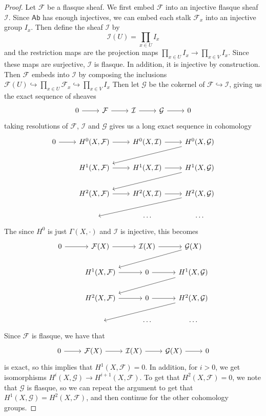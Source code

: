 \documentclass[psamsfonts, 12pt]{amsart}
\theoremstyle{definition}
\theoremstyle{remark}
\begin{document}
\begin{proof}
Let $\mathcal{F}$ be a flasque sheaf. We first embed $\mathcal{F}$ into an injective
flasque sheaf $\mathcal{I}$. Since $\mathsf{Ab}$ has enough injectives, we can embed
each stalk $\mathcal{F}_x$ into an injective group $I_x$. Then define the sheaf
$\mathcal{I}$ by
\[
\mathcal{I}(U) = \prod_{x \in U} I_x
\]
and the restriction maps are the projection maps
$\prod_{x \in U} I_x \to \prod_{x \in V} I_x$. Since these maps are surjective,
$\mathcal{I}$ is flasque. In addition, it is injective by construction. Then
$\mathcal{F}$ embeds into $\mathcal{I}$ by composing the inclusions
$\mathcal{F}(U)\hookrightarrow\prod_{x\in U}\mathcal{F}_x\hookrightarrow\prod_{x\in V}I_x$
Then let $\mathcal{G}$ be the cokernel of $\mathcal{F} \hookrightarrow \mathcal{I}$,
giving us the exact sequence of sheaves
\[\begin{tikzcd}
0 \ar[r] & \mathcal{F} \ar[r] & \mathcal{I} \ar[r] & \mathcal{G} \ar[r] & 0
\end{tikzcd}\]
taking resolutions of $\mathcal{F}$, $\mathcal{I}$ and $\mathcal{G}$ gives
us a long exact sequence in cohomology
\[\begin{tikzcd}
0 \ar[r] & H^0(X,\mathcal{F}) \ar[r] & H^0(X,\mathcal{I}) \ar[r]
& H^0(X,\mathcal{G}) \ar[dll] \\
& H^1(X,\mathcal{F}) \ar[r] & H^1(X, \mathcal{I}) \ar[r] & H^1(X,\mathcal{G})\ar[dll] \\
& H^2(X,\mathcal{F}) \ar[r] & H^2(X, \mathcal{I}) \ar[r] & H^2(X,\mathcal{G})\ar[dll] \\
& ~ & \cdots & \cdots
\end{tikzcd}\]
The since $H^0$ is just $\Gamma(X,\cdot)$ and $\mathcal{I}$ is injective, this becomes
\[\begin{tikzcd}
0 \ar[r] & \mathcal{F}(X) \ar[r] & \mathcal{I}(X) \ar[r] & \mathcal{G}(X) \ar[dll] \\
& H^1(X,\mathcal{F}) \ar[r] & 0 \ar[r] & H^1(X,\mathcal{G}) \ar[dll] \\
& H^2(X,\mathcal{F}) \ar[r] & 0 \ar[r] & H^2(X,\mathcal{G}) \ar[dll] \\
& ~ & \cdots & \cdots
\end{tikzcd}\]
Since $\mathcal{F}$ is flasque, we have that
\[\begin{tikzcd}
0 \ar[r] & \mathcal{F}(X) \ar[r] & \mathcal{I}(X) \ar[r] & \mathcal{G}(X) \ar[r] & 0
\end{tikzcd}\]
is exact, so this implies that $H^1(X,\mathcal{F}) = 0$. In addition, for $i > 0$,
we get isomorphisms $H^i(X,\mathcal{G}) \to H^{i+1}(X, \mathcal{F})$. To get that
$H^2(X,\mathcal{F}) = 0$, we note that $\mathcal{G}$ is flasque, so we can
repeat the argument to get that $H^1(X,\mathcal{G}) = H^2(X, \mathcal{F})$, and
then continue for the other cohomology groups.
\end{proof}
\end{document}
